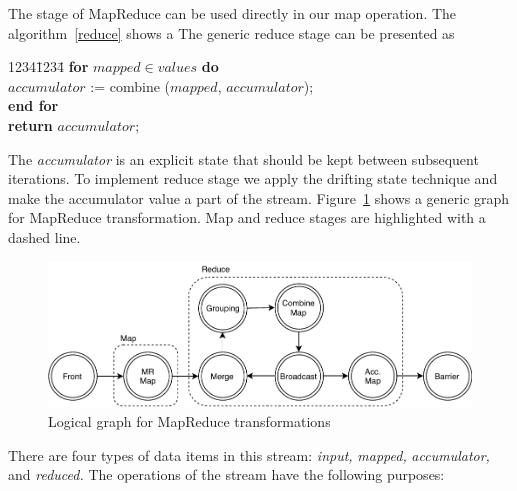 
\label{fs-drifting}

The  stage of MapReduce can be used  directly in  our map operation. 
The algorithm~\ref{reduce} shows a 
The generic reduce stage can be presented as

\begin {tabbing}
1234\=1234\= \kill
{\bf for} $mapped \in values$ {\bf do}   \\
\>$accumulator$ := combine ($mapped$, $accumulator$); \\
\> {\bf end for} \\
{\bf return } $accumulator$;
\end {tabbing}

The {\it accumulator} is an explicit state that should be kept between subsequent iterations.
%
%
To implement reduce stage we apply the drifting state technique and make the accumulator value a part of the stream. 
Figure~\ref{mapreduce-graph-figure} shows a generic graph for MapReduce transformation. 
Map and reduce stages are highlighted with a dashed line. 

\begin{figure}[ht]
  \centering
  \includegraphics[width=.5\textwidth]{pics/mapreduce}
  \caption{Logical graph for MapReduce transformations}
  \label {mapreduce-graph-figure}
\end{figure}

There are four types of data items in this stream: {\it input,} {\it mapped,}   {\it accumulator,} and {\it  reduced.} 
The operations of the stream have the following purposes:

